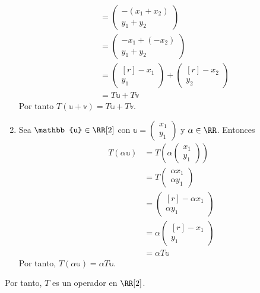 \begin{examplebox}{}{}
\begin{enumerate}[label=\roman*), topsep=6pt, itemsep=0pt]
\begin{align*}
            & = \begin{pmatrix}
                -(x_1 + x_2) \\
                y_1 + y_2
            \end{pmatrix} \\
            & = \begin{pmatrix}
                -x_1 + (-x_2) \\
                y_1 + y_2
            \end{pmatrix} \\
            & = \begin{pmatrix*}[r]
                -x_1 \\
                y_1
            \end{pmatrix*} + \begin{pmatrix*}[r]
                -x_2 \\
                y_2
            \end{pmatrix*} \\
            & = T\mathbb{u} + T\mathbb{v}
        \end{align*}
        Por tanto $T(\mathbb{u} + \mathbb{v}) = T\mathbb{u} + T\mathbb{v}$.
        \item Sea $\mathbb{u} \in \RR[2]$ con $\mathbb{u} = \begin{pmatrix}
            x_1 \\
            y_1
        \end{pmatrix}$ y $\alpha \in \RR$. Entonces
        \begin{align*}
            T(\alpha \mathbb{u}) & = T \left( \alpha \begin{pmatrix}
                x_1 \\
                y_1
            \end{pmatrix} \right) \\
            & = T \begin{pmatrix}
                \alpha x_1 \\
                \alpha y_1
            \end{pmatrix} \\
            & = \begin{pmatrix*}[r]
                - \alpha x_1 \\
                \alpha y_1
            \end{pmatrix*} \\
            & = \alpha \begin{pmatrix*}[r]
                -x_1 \\
                y_1
            \end{pmatrix*} \\
            & = \alpha T \mathbb{u}
        \end{align*}
        Por tanto, $T(\alpha \mathbb{u}) = \alpha T\mathbb{u}$.
    \end{enumerate}
    Por tanto, $T$ es un operador en $\RR[2]$.
\end{examplebox}

